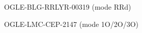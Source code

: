 \documentclass{beamer}
\begin{document}
\begin{frame}{OGLE-BLG-RRLYR-00319 (mode RRd)}
\makebox[\textwidth][c]{}
\end{frame}

\begin{frame}{OGLE-LMC-CEP-2147 (mode 1O/2O/3O)}
\makebox[\textwidth][c]{}
\end{frame}


%

%



\end{document}

